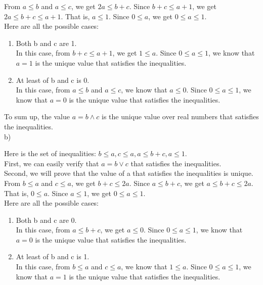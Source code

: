 \documentclass[12pt]{article}
\begin{document}
From $a \le b$ and $a \le c$, we get $2a \le b + c$. Since $b + c \le a
+ 1$, we get $2a \le b + c \le a + 1$. That is, $a \le 1$. Since $0 \le
a$, we get $0 \le a \le 1$. \\

Here are all the possible cases:

\begin{enumerate}
\item Both b and c are 1. \\
  In this case, from $b + c \le a + 1$, we get $1 \le a$. Since $0 \le
  a \le 1$, we know that $a = 1$ is the unique value that satisfies
  the inequalities.
\item At least of b and c is 0. \\
  In this case, from $a \le b$ and $a \le c$, we know that $a \le
  0$. Since $0 \le a \le 1$, we know that $a = 0$ is the unique value
  that satisfies the inequalities.
\end{enumerate}

To sum up, the value $a = b \land c$ is the unique value over real
numbers that satisfies the inequalities. \\

b)

Here is the set of inequalities: $b \le a, c \le a, a \le b + c, a \le
1$. \\

First, we can easily verify that $a = b \lor c$ that satisfies the
inequalities. \\

Second, we will prove that the value of a that satisfies the
inequalities is unique. \\

From $b \le a$ and $c \le a$, we get $b + c \le 2a$. Since $a \le b +
c$, we get $a \le b + c \le 2a$. That is, $0 \le a$. Since $a \le 1$,
we get $0 \le a \le 1$. \\

Here are all the possible cases:

\begin{enumerate}
\item Both b and c are 0. \\
  In this case, from $a \le b + c$, we get $a \le 0$. Since $0 \le
  a \le 1$, we know that $a = 0$ is the unique value that satisfies
  the inequalities.
\item At least of b and c is 1. \\
  In this case, from $b \le a$ and $c \le a$, we know that $1 \le
  a$. Since $0 \le a \le 1$, we know that $a = 1$ is the unique value
  that satisfies the inequalities.
\end{enumerate}
\end{document}
